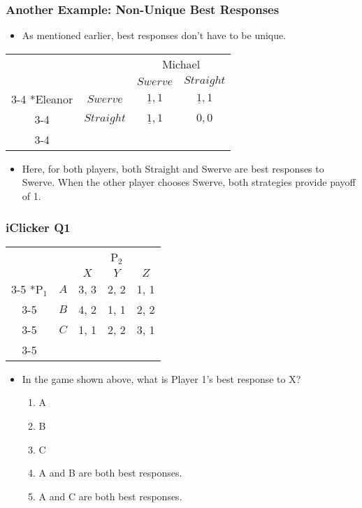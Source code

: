 \begin{frame}
\frametitle{Another Example: Non-Unique Best Responses}
\begin{itemize}
	\item As mentioned earlier, best responses don't have to be unique.
\end{itemize}
\begin{table}[h]
\centering
\begin{tabular}{cc|c|c|}
	& \multicolumn{1}{c}{} & \multicolumn{2}{c}{Michael}\\
	& \multicolumn{1}{c}{} & \multicolumn{1}{c}{$Swerve$}  & \multicolumn{1}{c}{$Straight$} \\\cline{3-4}
	\multirow{2}*{Eleanor}  & $Swerve$ & $\underline{1}, 1$ & $\underline{1}, 1$ \\\cline{3-4}
	& $Straight$ & $\underline{1}, 1$ & $0, 0$ \\\cline{3-4}
\end{tabular}
\end{table}
\begin{itemize}
	\item Here, for both players, both Straight and Swerve are best responses to Swerve. When the other player chooses Swerve, both strategies provide payoff of 1.
\end{itemize}
\end{frame}

\begin{frame}
\frametitle{iClicker Q1}
\begin{table}[h]
	\centering
	\begin{tabular}{cc|c|c|c|}
		& \multicolumn{1}{c}{} & \multicolumn{3}{c}{P$_2$}\\
		& \multicolumn{1}{c}{} & \multicolumn{1}{c}{$X$} & \multicolumn{1}{c}{$Y$} & \multicolumn{1}{c}{$Z$} \\\cline{3-5}
		\multirow{3}*{P$_1$}  & $A$ & 3, 3 & 2, 2 & 1, 1 \\\cline{3-5}
		& $B$ & 4, 2 & 1, 1 & 2, 2 \\\cline{3-5}
		& $C$ & 1, 1 & 2, 2 & 3, 1  \\\cline{3-5}
	\end{tabular}
\end{table}
\begin{itemize}
	\item In the game shown above, what is Player 1's best response to X?
	\begin{enumerate}
		\item A
		\item B
		\item C
		\item A and B are both best responses.
		\item A and C are both best responses.
	\end{enumerate}
\end{itemize}
\end{frame}

